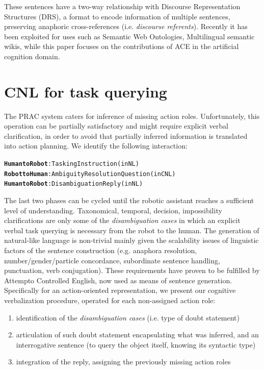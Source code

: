 \documentclass[oribibl]{llncs}
\begin{document}
These sentences have a two-way relationship with Discourse Representation Structures (DRS), a format to encode information of multiple sentences, preserving anaphoric cross-references (i.e. \textit{discourse referents})\cite{kamp1993discourse}.
Recently it has been exploited for uses such as Semantic Web Ontologies\cite{decoi2009rewerse}, Multilingual semantic wikis\cite{kuhnkaljurandsemantic}, while this paper focuses on the contributions of ACE in the artificial cognition domain.

\section{CNL for task querying}
The PRAC system caters for inference of missing action roles. Unfortunately, this operation can be partially satisfactory and might require explicit verbal clarification, in order to avoid that partially inferred information is translated into action planning.
We identify the following interaction:
{\large
\begin{alltt}
\textbf{\color{Red}Human to Robot} : Tasking Instruction            (in NL)
\textbf{\color{Blue}Robot to Human} : Ambiguity Resolution Question (in CNL)
\textbf{\color{Red}Human to Robot} : Disambiguation Reply           (in NL)
\end{alltt}
}
The last two phases can be cycled until the robotic assistant reaches a sufficient level of understanding. 
Taxonomical, temporal, decision, impossibility clarifications are only some of the \textit{disambiguation cases} in which an explicit verbal task querying is necessary from the robot to the human. 
The generation of natural-like language is non-trivial mainly given the scalability issues of linguistic factors of the sentence construction (e.g. anaphora resolution, number/gender/particle concordance, subordinate sentence handling, punctuation, verb conjugation). These requirements have proven to be fulfilled by Attempto Controlled English, now used as means of sentence generation.\\
Specifically for an action-oriented representation, we present our cognitive verbalization procedure, operated for each non-assigned action role:

\begin{enumerate} %
    \item identification of the \textit{disambiguation cases}  (i.e. type of doubt statement)\\
    \item articulation of such doubt statement encapsulating what was inferred, and an interrogative sentence (to query the object itself, knowing its syntactic type) \\ 
    \item integration of the reply, assigning the previously missing action roles 
\end{enumerate}
\end{document}
